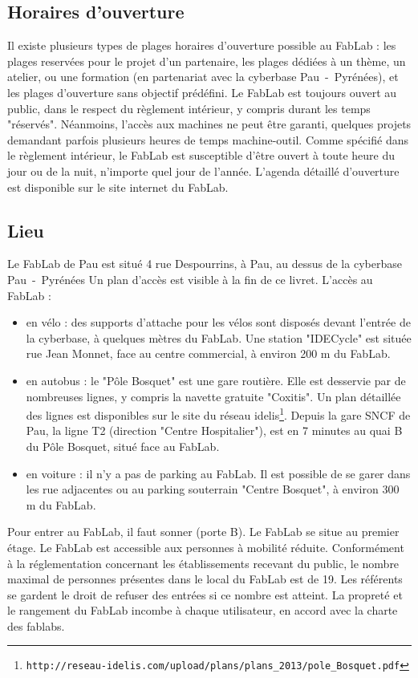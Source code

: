 \subsection{Horaires d'ouverture}
Il existe plusieurs types de plages horaires d'ouverture possible au FabLab : les plages reservées pour le projet d'un partenaire, les plages dédiées à un thème, un atelier, ou une formation (en partenariat avec la cyberbase Pau~-~Pyrénées), et les plages d'ouverture sans objectif prédéfini.
Le FabLab est toujours ouvert au public, dans le respect du règlement intérieur, y compris durant les temps "réservés". Néanmoins, l'accès aux machines ne peut être garanti, quelques projets demandant parfois plusieurs heures de temps machine-outil.
Comme spécifié dans le règlement intérieur, le FabLab est susceptible d'être ouvert à toute heure du jour ou de la nuit, n'importe quel jour de l'année.
L'agenda détaillé d'ouverture est disponible sur le site internet du FabLab. %

\subsection{Lieu}
Le FabLab de Pau est situé 4 rue Despourrins, à Pau, au dessus de la cyberbase Pau~-~Pyrénées
Un plan d'accès est visible à la fin de ce livret.
L'accès au FabLab :
\begin{itemize}
  \item en vélo : des supports d'attache pour les vélos sont disposés devant l'entrée de la cyberbase, à quelques mètres du FabLab. Une station "IDECycle" est située rue Jean Monnet, face au centre commercial, à environ 200 m du FabLab.
  \item en autobus : le "Pôle Bosquet" est une gare routière. Elle est desservie par de nombreuses lignes, y compris la navette gratuite "Coxitis". Un plan détaillée des lignes est disponibles sur le site du réseau idelis\footnote{\texttt{http://reseau-idelis.com/upload/plans/plans\_2013/pole\_Bosquet.pdf}}. Depuis la gare SNCF de Pau, la ligne T2 (direction "Centre Hospitalier"), est en 7 minutes au quai B du Pôle Bosquet, situé face au FabLab.
  \item en voiture : il n'y a pas de parking au FabLab. Il est possible de se garer dans les rue adjacentes ou au parking souterrain "Centre Bosquet", à environ 300 m du FabLab.
\end{itemize}
Pour entrer au FabLab, il faut sonner (porte B). Le FabLab se situe au premier étage. %
Le FabLab est accessible aux personnes à mobilité réduite.
Conformément à la réglementation concernant les établissements recevant du public, le nombre maximal de personnes présentes dans le local du FabLab est de 19. Les référents se gardent le droit de refuser des entrées si ce nombre est atteint.
La propreté et le rangement du FabLab incombe à chaque utilisateur, en accord avec la charte des fablabs.

